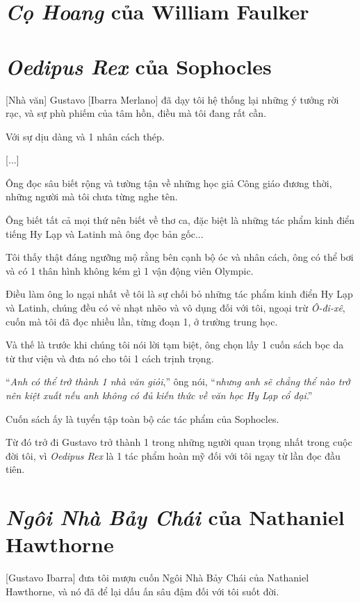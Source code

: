 \documentclass{book}
\numberwithin{equation}{section}
\begin{document}
\section{\textit{Cọ Hoang} của William Faulker}

\section{\textit{Oedipus Rex} của Sophocles}
[Nhà văn] Gustavo [Ibarra Merlano] đã dạy tôi hệ thống lại những ý tưởng rời rạc, và sự phù phiếm của tâm hồn, điều mà tôi đang rất cần.

Với sự dịu dàng và 1 nhân cách thép.

[$\ldots$]

%
Ông đọc sâu biết rộng và tường tận về những học giả Công giáo đương thời, những người mà tôi chưa từng nghe tên.

Ông biết tất cả mọi thứ nên biết về thơ ca, đặc biệt là những tác phẩm kinh điển tiếng Hy Lạp và Latinh mà ông đọc bản gốc$\ldots$

Tôi thấy thật đáng ngưỡng mộ rằng bên cạnh bộ óc và nhân cách, ông có thể bơi và có 1 thân hình không kém gì 1 vận động viên Olympic.

Điều làm ông lo ngại nhất về tôi là sự chối bỏ những tác phẩm kinh điển Hy Lạp và Latinh, chúng đều có vẻ nhạt nhẽo và vô dụng đối với tôi, ngoại trừ \textit{Ô-đi-xê}, cuốn mà tôi đã đọc nhiều lần, từng đoạn 1, ở trường trung học.

Và thế là trước khi chúng tôi nói lời tạm biệt, ông chọn lấy 1 cuốn sách bọc da từ thư viện và đưa nó cho tôi 1 cách trịnh trọng.

``\textit{Anh có thể trở thành 1 nhà văn giỏi},'' ông nói, ``\textit{nhưng anh sẽ chẳng thể nào trở nên kiệt xuất nếu anh không có đủ kiến thức về văn học Hy Lạp cổ đại}.''

Cuốn sách ấy là tuyển tập toàn bộ các tác phẩm của Sophocles.

Từ đó trở đi Gustavo trở thành 1 trong những người quan trọng nhất trong cuộc đời tôi, vì \textit{Oedipus Rex} là 1 tác phẩm hoàn mỹ đối với tôi ngay từ lần đọc đầu tiên.

\section{\textit{Ngôi Nhà Bảy Chái} của Nathaniel Hawthorne}
[Gustavo Ibarra] đưa tôi mượn cuốn Ngôi Nhà Bảy Chái của Nathaniel Hawthorne, và nó đã để lại dấu ấn sâu đậm đối với tôi suốt đời.
\end{document}
